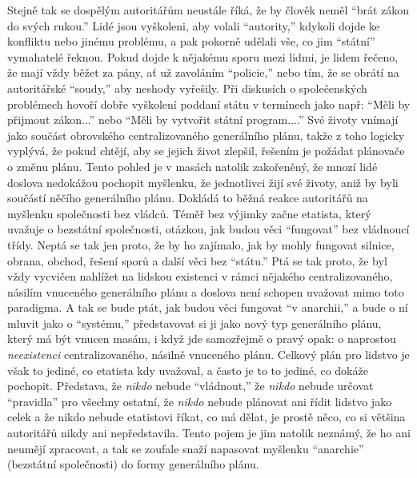 \documentclass{book}
\begin{document}
Stejně tak se dospělým autoritářům neustále říká, že by člověk neměl \enquote{brát zákon do svých rukou.} Lidé jsou vyškoleni, aby volali \enquote{autority,} kdykoli dojde ke konfliktu nebo jinému problému, a pak pokorně udělali vše, co jim \enquote{státní} vymahatelé řeknou. Pokud dojde k nějakému sporu mezi lidmi, je lidem řečeno, že mají vždy běžet za pány, ať už zavoláním \enquote{policie,} nebo tím, že se obrátí na autoritářské \enquote{soudy,} aby neshody vyřešily. Při diskusích o společenských problémech hovoří dobře vyškolení poddaní státu v termínech jako např: \enquote{Měli by přijmout zákon...} nebo \enquote{Měli by vytvořit státní program....} Své životy vnímají jako součást obrovského centralizovaného generálního plánu, takže z toho logicky vyplývá, že pokud chtějí, aby se jejich život zlepšil, řešením je požádat plánovače o změnu plánu. Tento pohled je v masách natolik zakořeněný, že mnozí lidé doslova nedokážou pochopit myšlenku, že jednotlivci žijí své životy, aniž by byli součástí něčího generálního plánu. Dokládá to běžná reakce autoritářů na myšlenku společnosti bez vládců. Téměř bez výjimky začne etatista, který uvažuje o bezstátní společnosti, otázkou, jak budou věci \enquote{fungovat} bez vládnoucí třídy. Neptá se tak jen proto, že by ho zajímalo, jak by mohly fungovat silnice, obrana, obchod, řešení sporů a další věci bez \enquote{státu.} Ptá se tak proto, že byl vždy vycvičen nahlížet na lidskou existenci v rámci nějakého centralizovaného, násilím vnuceného generálního plánu a doslova není schopen uvažovat mimo toto paradigma. A tak se bude ptát, jak budou věci fungovat \enquote{v anarchii,} a bude o ní mluvit jako o \enquote{systému,} představovat si ji jako nový typ generálního plánu, který má být vnucen masám, i když jde samozřejmě o pravý opak: o naprostou \emph{neexistenci} centralizovaného, násilně vnuceného plánu. Celkový plán pro lidstvo je však to jediné, co etatista kdy uvažoval, a často je to to jediné, co dokáže pochopit. Představa, že \emph{nikdo} nebude \enquote{vládnout,} že \emph{nikdo} nebude určovat \enquote{pravidla} pro všechny ostatní, že \emph{nikdo} nebude plánovat ani řídit lidstvo jako celek a že nikdo nebude etatistovi říkat, co má dělat, je prostě něco, co si většina autoritářů nikdy ani nepředstavila. Tento pojem je jim natolik neznámý, že ho ani neumějí zpracovat, a tak se zoufale snaží napasovat myšlenku \enquote{anarchie} (bezstátní společnosti) do formy generálního plánu.
\end{document}
